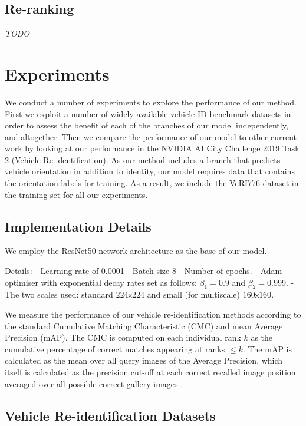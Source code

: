 \documentclass[10pt,twocolumn,letterpaper]{article}
\def\x{{\mathsf x}}
\begin{document}
\subsection{Re-ranking}

\emph{TODO}

\section{Experiments}

We conduct a number of experiments to explore the performance of our method. First we exploit a number of widely available vehicle ID benchmark datasets in order to assess the benefit of each of the branches of our model independently, and altogether. Then we compare the performance of our model to other current work by looking at our performance in the NVIDIA AI City Challenge 2019 Task 2 (Vehicle Re-identification). As our method includes a branch that predicts vehicle orientation in addition to identity, our model requires data that contains the orientation labels for training. As a result, we include the VeRI776 dataset \cite{liu2016veri} in the training set for all our experiments.

\subsection{Implementation Details}

We employ the ResNet50 \cite{} network architecture as the base of our model.

Details:
- Learning rate of 0.0001
- Batch size 8
- Number of epochs.
- Adam optimiser with exponential decay rates set as follows: $\beta_1=0.9$ and $\beta_2=0.999$.
- The two scales used: standard $224\x224$ and small (for multiscale) $160\x160$.

We measure the performance of our vehicle re-identification methods according to the standard Cumulative Matching Characteristic (CMC) and mean Average Precision (mAP). The CMC is computed on each individual rank $k$ as the cumulative percentage of correct matches appearing
at ranks $\leq k$. The mAP is calculated as the mean over all query images of the Average Precision, which itself is calculated as the precision cut-off at each correct recalled image position averaged over all possible correct gallery images \cite{}.

\subsection{Vehicle Re-identification Datasets}
\end{document}
